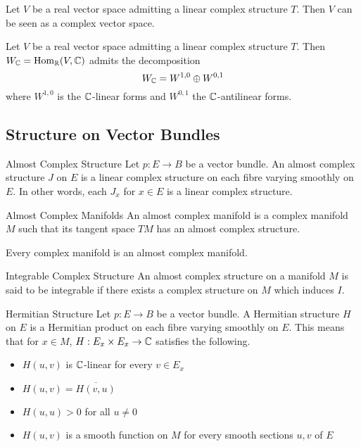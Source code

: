 \documentclass[a4paper]{article}
\begin{document}
\begin{prp}{}{} Let $V$ be a real vector space admitting a linear complex structure $T$. Then $V$ can be seen as a complex vector space. 
\end{prp}

\begin{prp}{}{} Let $V$ be a real vector space admitting a linear complex structure $T$. Then $W_{\mathbb{C}}=\operatorname{Hom}_{\mathbb{R}}(V,\mathbb{C})$ admits the decomposition $$W_{\mathbb{C}}=W^{1,0}\oplus W^{0,1}$$ where $W^{1,0}$ is the $\mathbb{C}$-linear forms and $W^{0,1}$ the $\mathbb{C}$-antilinear forms. 
\end{prp}

\subsection{Structure on Vector Bundles}
\begin{defn}{Almost Complex Structure}{} Let $p:E\to B$ be a vector bundle. An almost complex structure $J$ on $E$ is a linear complex structure on each fibre varying smoothly on $E$. In other words, each $J_x$ for $x\in E$ is a linear complex structure. 
\end{defn}

\begin{defn}{Almost Complex Manifolds}{} An almost complex manifold is a complex manifold $M$ such that its tangent space $TM$ has an almost complex structure. 
\end{defn}

\begin{prp}{}{} Every complex manifold is an almost complex manifold. 
\end{prp}

\begin{defn}{Integrable Complex Structure}{} An almost complex structure on a manifold $M$ is said to be integrable if there exists a complex structure on $M$ which induces $I$. 
\end{defn}

\begin{defn}{Hermitian Structure}{} Let $p:E\to B$ be a vector bundle. A Hermitian structure $H$ on $E$ is a Hermitian product on each fibre varying smoothly on $E$. This means that for $x\in M$, $H:E_x\times E_x\to\mathbb{C}$ satisfies the following.
\begin{itemize}
\item $H(u,v)$ is $\mathbb{C}$-linear for every $v\in E_x$
\item $H(u,v)=\overline{H(v,u)}$
\item $H(u,u)>0$ for all $u\neq 0$
\item $H(u,v)$ is a smooth function on $M$ for every smooth sections $u,v$ of $E$
\end{itemize}
\end{defn}
\end{document}

